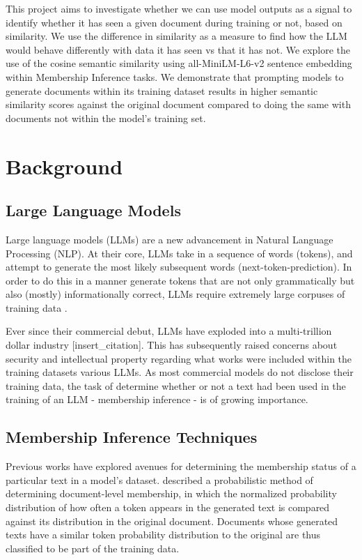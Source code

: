 \documentclass[sigconf]{acmart}
\begin{document}
This project aims to investigate whether we can use model outputs as a signal to identify whether it has seen a given document during training or not, based on similarity. We use the difference in similarity as a measure to find how the LLM would behave differently with data it has seen vs that it has not. We explore the use of the cosine semantic similarity using all-MiniLM-L6-v2 sentence embedding within Membership Inference tasks. We demonstrate that prompting models to generate documents within its training dataset results in higher semantic similarity scores against the original document compared to doing the same with documents not within the model's training set.

\section{Background}
\subsection{Large Language Models}
Large language models (LLMs) are a new advancement in Natural Language Processing (NLP). At their core, LLMs take in a sequence of words (tokens), and attempt to generate the most likely subsequent words (next-token-prediction). In order to do this in a manner generate tokens that are not only grammatically but also (mostly) informationally correct, LLMs require extremely large corpuses of training data \cite{stochastic_parrots}.

Ever since their commercial debut, LLMs have exploded into a multi-trillion dollar industry [insert\_citation]. This has subsequently raised concerns about security and intellectual property regarding what works were included within the training datasets various LLMs\cite{bloomberg_artist_suit}. As most commercial models do not disclose their training data\cite{gpt4_technical_report}, the task of determine whether or not a text had been used in the training of an LLM - membership inference - is of growing importance.

\subsection{Membership Inference Techniques}

Previous works have explored avenues for determining the membership status of a particular text in a model's dataset. \cite{neurons_read_your_book} described a probabilistic method of determining document-level membership, in which the normalized probability distribution of how often a token appears in the generated text is compared against its distribution in the original document. Documents whose generated texts have a similar token probability distribution to the original are thus classified to be part of the training data.
\end{document}
